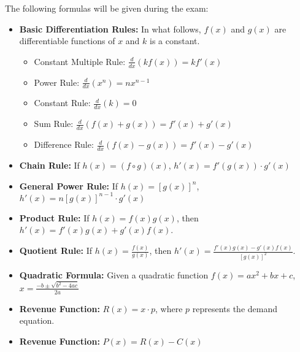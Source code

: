 The following formulas will be given during the exam:
\begin{itemize}[leftmargin=*]
\item \textbf{Basic Differentiation Rules:} In what follows, $f(x)$ and $g(x)$ are differentiable functions of $x$ and $k$ is a constant.
\begin{itemize}
    \item Constant Multiple Rule: $\displaystyle\frac{d}{dx}(kf(x))=kf'(x)$
    \item Power Rule: $\displaystyle\frac{d}{dx}(x^n)=nx^{n-1}$
    \item Constant Rule: $\displaystyle\frac{d}{dx}(k)=0$
    \item Sum Rule: $\displaystyle\frac{d}{dx}(f(x)+g(x))=f'(x)+g'(x)$
     \item Difference Rule: $\displaystyle\frac{d}{dx}(f(x)-g(x))=f'(x)-g'(x)$\\
\end{itemize}
\item \textbf{Chain Rule:} If $h(x)=(f\circ g)(x)$, $h'(x)=f'(g(x))\cdot g'(x)$\\
\item \textbf{General Power Rule:} If $h(x)=[g(x)]^n$, $h'(x)=n[g(x)]^{n-1}\cdot g'(x)$\\
\item \textbf{Product Rule:} If $h(x)=f(x)g(x)$, then $h'(x)=f'(x)g(x)+g'(x)f(x)$.\\
\item \textbf{Quotient Rule:} If $h(x)=\displaystyle\frac{f(x)}{g(x)}$, then $h'(x)=\displaystyle\frac{f'(x)g(x)-g'(x)f(x)}{[g(x)]^2}$.\\
\item \textbf{Quadratic Formula:} Given a quadratic function $f(x)=ax^2+bx+c$, $x=\displaystyle\frac{-b\pm \sqrt{b^2-4ac}}{2a}$
\item \textbf{Revenue Function:} $R(x)=x\cdot p$, where $p$ represents the demand equation.
\item \textbf{Revenue Function:} $P(x)=R(x)-C(x)$
\end{itemize}


